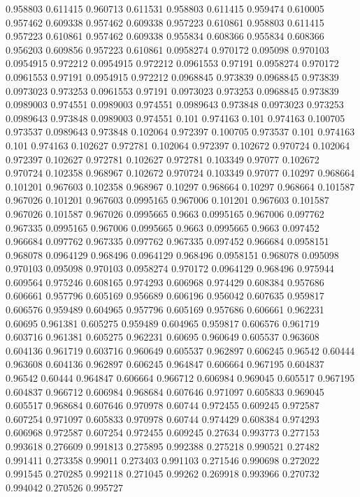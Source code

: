 0.958803 0.611415
0.960713 0.611531
0.958803 0.611415
0.959474 0.610005
0.957462 0.609338
0.957462 0.609338
0.957223 0.610861
0.958803 0.611415
0.957223 0.610861
0.957462 0.609338
0.955834 0.608366
0.955834 0.608366
0.956203 0.609856
0.957223 0.610861
0.0958274 0.970172
0.095098 0.970103
0.0954915 0.972212
0.0954915 0.972212
0.0961553 0.97191
0.0958274 0.970172
0.0961553 0.97191
0.0954915 0.972212
0.0968845 0.973839
0.0968845 0.973839
0.0973023 0.973253
0.0961553 0.97191
0.0973023 0.973253
0.0968845 0.973839
0.0989003 0.974551
0.0989003 0.974551
0.0989643 0.973848
0.0973023 0.973253
0.0989643 0.973848
0.0989003 0.974551
0.101 0.974163
0.101 0.974163
0.100705 0.973537
0.0989643 0.973848
0.102064 0.972397
0.100705 0.973537
0.101 0.974163
0.101 0.974163
0.102627 0.972781
0.102064 0.972397
0.102672 0.970724
0.102064 0.972397
0.102627 0.972781
0.102627 0.972781
0.103349 0.97077
0.102672 0.970724
0.102358 0.968967
0.102672 0.970724
0.103349 0.97077
0.10297 0.968664
0.101201 0.967603
0.102358 0.968967
0.10297 0.968664
0.10297 0.968664
0.101587 0.967026
0.101201 0.967603
0.0995165 0.967006
0.101201 0.967603
0.101587 0.967026
0.101587 0.967026
0.0995665 0.9663
0.0995165 0.967006
0.097762 0.967335
0.0995165 0.967006
0.0995665 0.9663
0.0995665 0.9663
0.097452 0.966684
0.097762 0.967335
0.097762 0.967335
0.097452 0.966684
0.0958151 0.968078
0.0964129 0.968496
0.0964129 0.968496
0.0958151 0.968078
0.095098 0.970103
0.095098 0.970103
0.0958274 0.970172
0.0964129 0.968496
0.975944 0.609564
0.975246 0.608165
0.974293 0.606968
0.974429 0.608384
0.957686 0.606661
0.957796 0.605169
0.956689 0.606196
0.956042 0.607635
0.959817 0.606576
0.959489 0.604965
0.957796 0.605169
0.957686 0.606661
0.962231 0.60695
0.961381 0.605275
0.959489 0.604965
0.959817 0.606576
0.961719 0.603716
0.961381 0.605275
0.962231 0.60695
0.960649 0.605537
0.963608 0.604136
0.961719 0.603716
0.960649 0.605537
0.962897 0.606245
0.96542 0.60444
0.963608 0.604136
0.962897 0.606245
0.964847 0.606664
0.967195 0.604837
0.96542 0.60444
0.964847 0.606664
0.966712 0.606984
0.969045 0.605517
0.967195 0.604837
0.966712 0.606984
0.968684 0.607646
0.971097 0.605833
0.969045 0.605517
0.968684 0.607646
0.970978 0.60744
0.972455 0.609245
0.972587 0.607254
0.971097 0.605833
0.970978 0.60744
0.974429 0.608384
0.974293 0.606968
0.972587 0.607254
0.972455 0.609245
0.27634 0.993773
0.277153 0.993618
0.276609 0.991813
0.275895 0.992388
0.275218 0.990521
0.27482 0.991411
0.273358 0.99011
0.273403 0.991103
0.271546 0.990698
0.272022 0.991545
0.270285 0.992118
0.271045 0.99262
0.269918 0.993966
0.270732 0.994042
0.270526 0.995727
